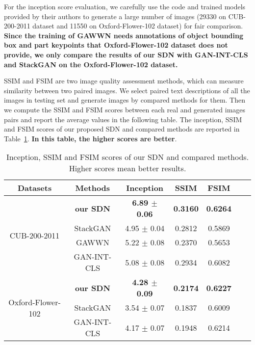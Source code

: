 \documentclass[sigconf]{acmart}
\begin{document}
For the inception score evaluation, we carefully use the code and trained models provided by their authors to generate a large number of images (29330 on CUB-200-2011 dataset and 11550 on Oxford-Flower-102 dataset) for fair comparison. \textbf{Since the training of GAWWN needs annotations of object bounding box and part keypoints that Oxford-Flower-102 dataset does not provide, we only compare the results of our SDN with GAN-INT-CLS and StackGAN on the Oxford-Flower-102 dataset.} 

SSIM and FSIM are two image quality assessment methods, which can measure similarity between two paired images. We select paired text descriptions of all the images in testing set and generate images by compared methods for them. Then we compute the SSIM and FSIM scores between each real and generated images pairs and report the average values in the following table. The inception, SSIM and FSIM scores of our proposed SDN and compared methods are reported in Table~\ref{table:Inception}. \textbf{In this table, the higher scores are better}.


\begin{table}[htb]
	\caption{Inception, SSIM and FSIM scores of our SDN and compared methods. Higher scores mean better results. }
	\begin{center}
		\begin{tabular}{|c|c|c|c|c|c|c|} 
			\hline
			Datasets & Methods & Inception & SSIM & FSIM\\
			\hline
			
			\multirow{4}{1.5cm}{CUB-200-2011} & \textbf{our SDN} & \textbf{6.89 $\pm$ 0.06} & \textbf{0.3160} & \textbf{0.6264} \\
			& StackGAN & 4.95 $\pm$ 0.04 & 0.2812 & 0.5869 \\
			& GAWWN & 5.22 $\pm$ 0.08 & 0.2370 & 0.5653 \\
			& GAN-INT-CLS & 5.08 $\pm$ 0.08 & 0.2934 & 0.6082 \\
			\hline
			
			\multirow{3}{1.5cm}{Oxford-Flower-102} & \textbf{our SDN} & \textbf{4.28 $\pm$ 0.09} & \textbf{0.2174} & \textbf{0.6227} \\
			& StackGAN & 3.54 $\pm$ 0.07 & 0.1837 & 0.6009 \\
			& GAN-INT-CLS & 4.17 $\pm$ 0.07 & 0.1948 & 0.6214 \\
			\hline
		\end{tabular} 
	\end{center}
	\label{table:Inception}
\end{table}
\end{document}
